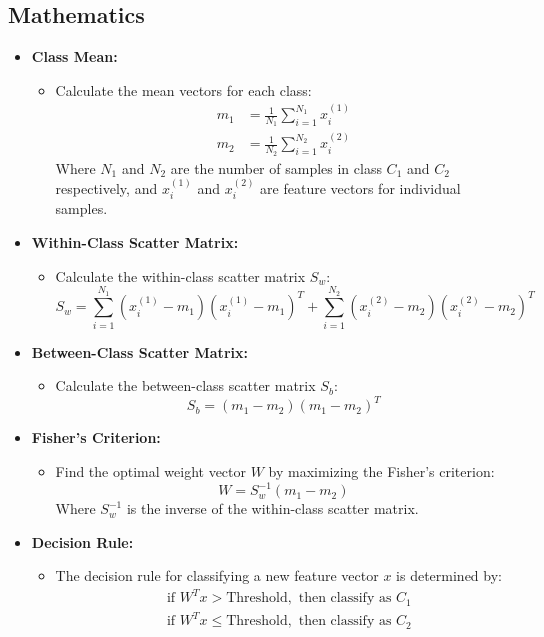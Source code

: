\subsection{Mathematics}

\begin{itemize}[leftmargin=*]
    \item \textbf{Class Mean:}
    \begin{itemize}
        \item Calculate the mean vectors for each class:
        \begin{align*}
            m_1 &= \frac{1}{N_1} \sum_{i=1}^{N_1} x_i^{(1)} \\
            m_2 &= \frac{1}{N_2} \sum_{i=1}^{N_2} x_i^{(2)}
        \end{align*}
        Where \(N_1\) and \(N_2\) are the number of samples in class \(C_1\) and \(C_2\) respectively, and \(x_i^{(1)}\) and \(x_i^{(2)}\) are feature vectors for individual samples.
    \end{itemize}
    
    \item \textbf{Within-Class Scatter Matrix:}
    \begin{itemize}
        \item Calculate the within-class scatter matrix \(S_w\):
        \[ S_w = \sum_{i=1}^{N_1} (x_i^{(1)} - m_1)(x_i^{(1)} - m_1)^T + \sum_{i=1}^{N_2} (x_i^{(2)} - m_2)(x_i^{(2)} - m_2)^T \]
    \end{itemize}
    
    \item \textbf{Between-Class Scatter Matrix:}
    \begin{itemize}
        \item Calculate the between-class scatter matrix \(S_b\):
        \[ S_b = (m_1 - m_2)(m_1 - m_2)^T \]
    \end{itemize}
    
    \item \textbf{Fisher's Criterion:}
    \begin{itemize}
        \item Find the optimal weight vector \(W\) by maximizing the Fisher's criterion:
        \[ W = S_w^{-1} (m_1 - m_2) \]
        Where \(S_w^{-1}\) is the inverse of the within-class scatter matrix.
    \end{itemize}
    
    \item \textbf{Decision Rule:}
    \begin{itemize}
        \item The decision rule for classifying a new feature vector \(x\) is determined by:
        \begin{align*}
            &\text{if } W^T x > \text{Threshold}, \text{ then classify as } C_1 \\
            &\text{if } W^T x \leq \text{Threshold}, \text{ then classify as } C_2
        \end{align*}
    \end{itemize}
\end{itemize}

\clearpage 


